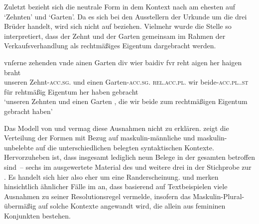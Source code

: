 
Zuletzt bezieht sich die neutrale Form  in 
dem Kontext nach am ehesten auf  `Zehnten' und 
`Garten'. Da es sich bei den Ausstellern der Urkunde um die drei Brüder
\autocites(Nrn.~1201~AB)[472,6--7]{cao2} handelt, wird sich  nicht
auf  beziehen. Vielmehr wurde die Stelle so interpretiert, dass der
Zehnt und der Garten gemeinsam im Rahmen der Verkaufsverhandlung als
rechtmäßiges Eigentum dargebracht werden.

\begin{exe}
\ex \label{ex:m+m_beidiu_5}
	\gll vnſerne zehenden \textelp{} vnde ainen Garten \textelp{} div wier
			baidiv fvr reht aigen her haigen braht \\
		unseren Zehnt-\textsc{acc.sg.\MascI} {} und einen
		Garten-\textsc{acc.sg.\MascI} {} \textsc{rel.acc.pl.\NeutI} wir
		beide-\textsc{acc.pl.\NeutI.st} für rehtmäßig Eigentum her haben
		gebracht \\
	\trans `unseren Zehnten \textelp{} und einen Garten \textelp{}, die wir
		beide zum rechtmäßigen Eigentum gebracht haben'
		\parencites(Nrn.~1201~AB, Kl.~Heiligkreuztal, Kr.~Biberach, 1290)[472,10--14]{cao2}
\end{exe}

Das Modell von \citet{wechsler2009} und \citet{wechslerzlatic2003} vermag diese
Ausnahmen nicht zu erklären.  zeigt die
Verteilung der Formen mit Bezug auf
maskulin-männliche und maskulin-unbelebte  auf
die unterschiedlichen belegten syntaktischen Kontexte. Hervorzuheben ist, dass
insgesamt lediglich neun Belege in der gesamten  betroffen
sind~-- sechs im ausgewertete Material des \CAO{} und weitere drei in der
Stichprobe zur \KC{}. Es handelt sich hier also eher um eine Randerscheinung.
\citet[581]{wechsler2009} und \citet[190]{wechslerzlatic2003} merken
hinsichtlich ähnlicher Fälle im  an, dass
\citet{corbett1983,corbett1991} basierend auf Textbeispielen viele
Ausnahmen zu seiner Resolutionsregel vermelde, insofern das
Maskulin-Plural- übermäßig auf solche Kontexte
angewandt wird, die allein aus femininen Konjunkten bestehen.


